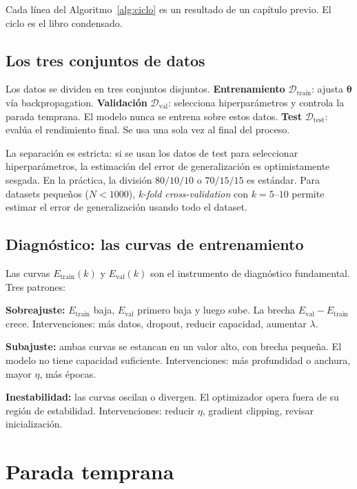 Cada línea del Algoritmo~\ref{alg:ciclo} es un resultado de un capítulo
previo. El ciclo es el libro condensado.

\subsection{Los tres conjuntos de datos}
\label{subsec:tres_conjuntos}

Los datos se dividen en tres conjuntos disjuntos.
\textbf{Entrenamiento} $\mathcal{D}_{\text{train}}$: ajusta
$\bm{\theta}$ vía backpropagation.
\textbf{Validación} $\mathcal{D}_{\text{val}}$: selecciona
hiperparámetros y controla la parada temprana. El modelo nunca se
entrena sobre estos datos.
\textbf{Test} $\mathcal{D}_{\text{test}}$: evalúa el rendimiento final.
Se usa una sola vez al final del proceso.

La separación es estricta: si se usan los datos de test para seleccionar
hiperparámetros, la estimación del error de generalización es
optimistamente sesgada. En la práctica, la división $80/10/10$ o
$70/15/15$ es estándar. Para datasets pequeños ($N < 1000$),
\textit{k-fold cross-validation} con $k = 5$--$10$ permite estimar el
error de generalización usando todo el dataset.

\subsection{Diagnóstico: las curvas de entrenamiento}
\label{subsec:diagnostico}

Las curvas $E_{\text{train}}(k)$ y $E_{\text{val}}(k)$ son el
instrumento de diagnóstico fundamental. Tres patrones:

\textbf{Sobreajuste:} $E_{\text{train}}$ baja, $E_{\text{val}}$ primero
baja y luego sube. La brecha $E_{\text{val}} - E_{\text{train}}$ crece.
Intervenciones: más datos, dropout, reducir capacidad, aumentar $\lambda$.

\textbf{Subajuste:} ambas curvas se estancan en un valor alto, con brecha
pequeña. El modelo no tiene capacidad suficiente.
Intervenciones: más profundidad o anchura, mayor $\eta$, más épocas.

\textbf{Inestabilidad:} las curvas oscilan o divergen. El optimizador
opera fuera de su región de estabilidad.
Intervenciones: reducir $\eta$, gradient clipping, revisar
inicialización.

\section{Parada temprana}
\label{sec:early_stopping}

